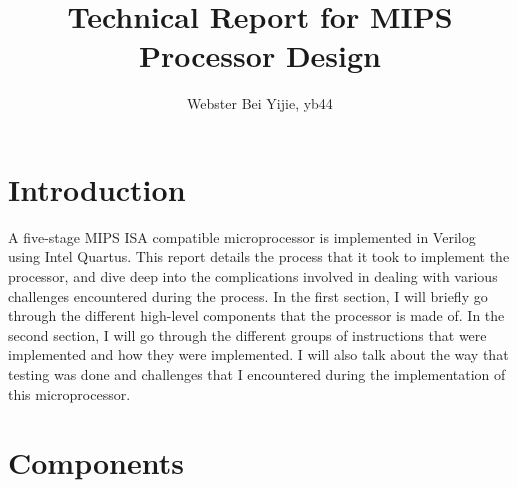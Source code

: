 \documentclass{article}
\title{Technical Report for MIPS Processor Design}
\author{Webster Bei Yijie, yb44}
\begin{document}
	\maketitle
	\tableofcontents
	\newpage
	\section{Introduction}
	A five-stage MIPS ISA compatible microprocessor is implemented in Verilog using Intel Quartus. This report details the process that it took to implement the processor, and dive deep into the complications involved in dealing with various challenges encountered during the process. In the first section, I will briefly go through the different high-level components that the processor is made of. In the second section, I will go through the different groups of instructions that were implemented and how they were implemented. I will also talk about the way that testing was done and challenges that I encountered during the implementation of this microprocessor.  
	\section{Components}
\end{document}
